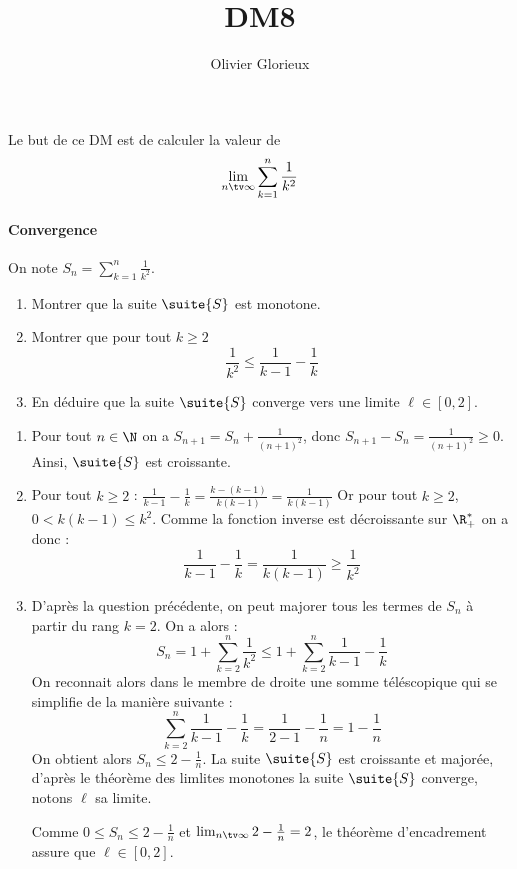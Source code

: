 \documentclass[a4paper, 11pt,reqno]{article}
\author{Olivier Glorieux}
\begin{document}
\title{DM8
}


Le but de ce DM est de calculer la valeur de 
$$\lim_{n\tv \infty} \sum_{k=1}^n \frac{1}{k^2}$$

\paragraph{Convergence}
On note $S_n=  \sum_{k=1}^n \frac{1}{k^2}$.

\begin{enumerate}
\item Montrer que la suite $\suite{S}$  est monotone. 
\item Montrer que pour tout $k\geq 2$
$$\frac{1}{k^2} \leq \frac{1}{k-1}-\frac{1}{k}$$
\item En déduire que la suite $\suite{S}$ converge vers une limite $\ell \in [0,2]$. 
\end{enumerate}

\begin{correction}
\begin{enumerate}
\item Pour tout $n\in \N$ on a  $S_{n+1} = S_n + \frac{1}{(n+1)^2}$, donc 
$S_{n+1}-S_n = \frac{1}{(n+1)^2}\geq 0$. Ainsi, $\suite{S}$ est croissante. 
\item Pour tout $k\geq 2$ : $\frac{1}{k-1}-\frac{1}{k}= \frac{k-(k-1)}{k(k-1)}= \frac{1}{k(k-1)}$
Or pour tout $k\geq 2$,  $0<k(k-1) \leq k^2$. Comme la fonction inverse est décroissante sur $\R_+^*$ on a donc : 
$$\frac{1}{k-1}-\frac{1}{k}=\frac{1}{k(k-1)}\geq \frac{1}{k^2}$$

\item  D'après la question précédente, on peut majorer tous les termes de $S_n$ à partir du rang $k=2$. On  a alors : 
$$S_n = 1+ \sum_{k=2}^n\frac{1}{k^2} \leq 1 + \sum_{k=2}^n\frac{1}{k-1} -\frac{1}{k}$$
On reconnait alors dans le  membre de droite une somme téléscopique qui se simplifie de la manière suivante : 
$$\sum_{k=2}^n\frac{1}{k-1} -\frac{1}{k} = \frac{1}{2-1} -\frac{1}{n} = 1-\frac{1}{n}$$
On obtient alors $S_n  \leq 2-\frac{1}{n}$. 
La suite $\suite{S}$ est croissante et majorée, d'après le théorème des limlites monotones la suite $\suite{S}$ converge, notons $\ell$ sa limite. 

Comme $0\leq S_n\leq 2-\frac{1}{n}$ et $\lim_{n\tv \infty} 2-\frac{1}{n}=2$, le théorème d'encadrement assure que $\ell\in [0,2]$. 
 


\end{enumerate}
\end{correction}
\end{document}
